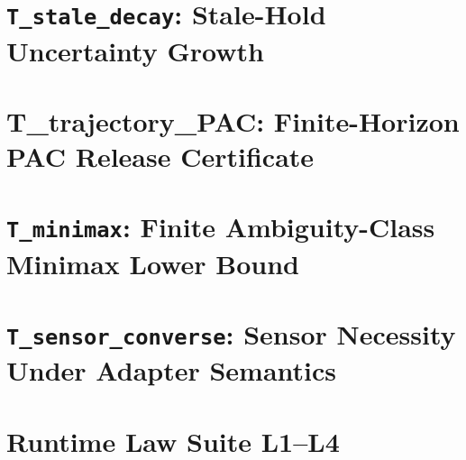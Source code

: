 \section{\texttt{T\_stale\_decay}: Stale-Hold Uncertainty Growth}


\section{T\_trajectory\_PAC: Finite-Horizon PAC Release Certificate}


\section{\texttt{T\_minimax}: Finite Ambiguity-Class Minimax Lower Bound}


\section{\texttt{T\_sensor\_converse}: Sensor Necessity Under Adapter Semantics}


\section{Runtime Law Suite L1--L4}




